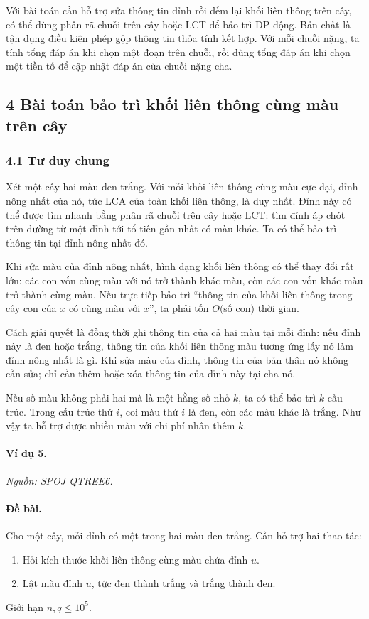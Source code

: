 \documentclass[11pt]{article}
\begin{document}
Với bài toán cần hỗ trợ sửa thông tin đỉnh rồi đếm lại khối liên thông trên cây,
có thể dùng phân rã chuỗi trên cây hoặc LCT để bảo trì DP động. Bản chất là tận
dụng điều kiện phép gộp thông tin thỏa tính kết hợp. Với mỗi chuỗi nặng, ta tính
tổng đáp án khi chọn một đoạn trên chuỗi, rồi dùng tổng đáp án khi chọn một tiền
tố để cập nhật đáp án của chuỗi nặng cha.

\subsection*{4 Bài toán bảo trì khối liên thông cùng màu trên cây}

\subsubsection*{4.1 Tư duy chung}

Xét một cây hai màu đen-trắng. Với mỗi khối liên thông cùng màu cực đại, đỉnh
nông nhất của nó, tức LCA của toàn khối liên thông, là duy nhất. Đỉnh này có thể
được tìm nhanh bằng phân rã chuỗi trên cây hoặc LCT: tìm đỉnh áp chót trên đường
từ một đỉnh tới tổ tiên gần nhất có màu khác. Ta có thể bảo trì thông tin tại
đỉnh nông nhất đó.

Khi sửa màu của đỉnh nông nhất, hình dạng khối liên thông có thể thay đổi rất
lớn: các con vốn cùng màu với nó trở thành khác màu, còn các con vốn khác màu
trở thành cùng màu. Nếu trực tiếp bảo trì ``thông tin của khối liên thông trong
cây con của \(x\) có cùng màu với \(x\)'', ta phải tốn \(O(\)số con\()\) thời
gian.

Cách giải quyết là đồng thời ghi thông tin của cả hai màu tại mỗi đỉnh: nếu đỉnh
này là đen hoặc trắng, thông tin của khối liên thông màu tương ứng lấy nó làm
đỉnh nông nhất là gì. Khi sửa màu của đỉnh, thông tin của bản thân nó không cần
sửa; chỉ cần thêm hoặc xóa thông tin của đỉnh này tại cha nó.

Nếu số màu không phải hai mà là một hằng số nhỏ \(k\), ta có thể bảo trì \(k\)
cấu trúc. Trong cấu trúc thứ \(i\), coi màu thứ \(i\) là đen, còn các màu khác
là trắng. Như vậy ta hỗ trợ được nhiều màu với chi phí nhân thêm \(k\).

\paragraph{Ví dụ 5.}
\emph{Nguồn: SPOJ QTREE6.}

\paragraph{Đề bài.}
Cho một cây, mỗi đỉnh có một trong hai màu đen-trắng. Cần hỗ trợ hai thao tác:
\begin{enumerate}
  \item Hỏi kích thước khối liên thông cùng màu chứa đỉnh \(u\).
  \item Lật màu đỉnh \(u\), tức đen thành trắng và trắng thành đen.
\end{enumerate}
Giới hạn \(n,q\le 10^5\).
\end{document}
